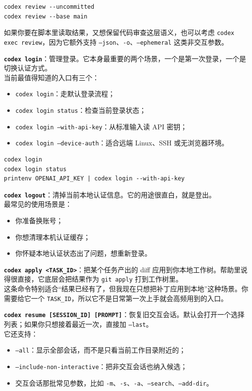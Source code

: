 \documentclass[UTF8,a4paper,12pt]{ctexart}
\begin{document}
\begin{lstlisting}[style=cli]
codex review --uncommitted
codex review --base main
\end{lstlisting}

如果你要在脚本里读取结果，又想保留代码审查这层语义，也可以考虑 \texttt{codex exec review}，因为它额外支持 \texttt{--json}、\texttt{-o}、\texttt{--ephemeral} 这类非交互参数。

\medskip
\textbf{\texttt{codex login}}：管理登录。它本身最重要的两个场景，一个是第一次登录，一个是切换认证方式。\\
当前最值得知道的入口有三个：
\begin{itemize}
  \item \texttt{codex login}：走默认登录流程；
  \item \texttt{codex login status}：检查当前登录状态；
  \item \texttt{codex login --with-api-key}：从标准输入读 API 密钥；
  \item \texttt{codex login --device-auth}：适合远端 Linux、SSH 或无浏览器环境。
\end{itemize}

\begin{lstlisting}[style=cli]
codex login
codex login status
printenv OPENAI_API_KEY | codex login --with-api-key
\end{lstlisting}

\medskip
\textbf{\texttt{codex logout}}：清掉当前本地认证信息。它的用途很直白，就是登出。\\
最常见的使用场景是：
\begin{itemize}
  \item 你准备换账号；
  \item 你想清理本机认证缓存；
  \item 你怀疑本地认证状态出了问题，想重新登录。
\end{itemize}

\medskip
\textbf{\texttt{codex apply <TASK\_ID>}}：把某个任务产出的 diff 应用到你本地工作树。帮助里说得很直接，它底层会把结果作为 \texttt{git apply} 打到工作树里。\\
这条命令特别适合“结果已经有了，但我现在只想把补丁应用到本地”这种场景。你需要给它一个 \texttt{TASK\_ID}，所以它不是日常第一次上手就会高频用到的入口。

\medskip
\textbf{\texttt{codex resume [SESSION\_ID] [PROMPT]}}：恢复旧交互会话。默认会打开一个选择列表；如果你只想接着最近一次，直接加 \texttt{--last}。\\
它还支持：
\begin{itemize}
  \item \texttt{--all}：显示全部会话，而不是只看当前工作目录附近的；
  \item \texttt{--include-non-interactive}：把非交互会话也纳入候选；
  \item 交互会话那批常见参数，比如 \texttt{-m}、\texttt{-s}、\texttt{-a}、\texttt{--search}、\texttt{--add-dir}。
\end{itemize}
\end{document}
